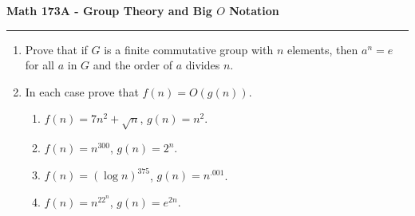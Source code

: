 \documentclass[11pt,letterpaper]{article}
\begin{document}
\begin{center}
{\bf \Large Math 173A - Group Theory and Big $O$ Notation}
\vspace{0.2cm}
\hrule
\end{center}

\begin{enumerate}

    \item Prove that if $G$ is a finite commutative group with $n$ elements, then $a^n = e$ for all $a$ in $G$ and the order of $a$ divides $n$.

    \vfill

    \item In each case prove that $f(n) = O(g(n))$.
    \begin{enumerate}
        \item $f(n) = 7n^2 + \sqrt{n}$, $g(n) = n^2$.

        \item $f(n) = n^{300}$, $g(n) = 2^n$.

        \item $f(n) = (\log n)^{375}$, $g(n) = n^{.001}$.

        \item $f(n) = n^22^n$, $g(n) = e^{2n}$.
    \end{enumerate}

    \vfill

\end{enumerate}
\end{document}
